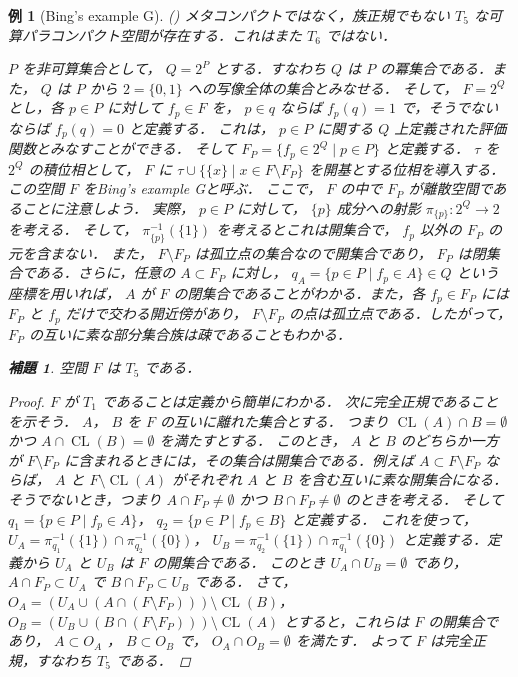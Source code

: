 \documentclass[leqno, 12pt]{ltjsarticle}
\newtheorem{lem}[thm]{補題}
\newtheorem{exam}[thm]{例}
\DeclareMathOperator{\cl}{CL}
\begin{document}
\begin{exam}[Bing's example G](\cite{Bing})
メタコンパクトではなく，族正規でもない
$T_{5}$
な可算パラコンパクト空間が存在する．これはまた
$T_{6}$
ではない．

$P$
を非可算集合として，
$Q=2^{P}$
とする．すなわち
$Q$
は
$P$
の冪集合である．また，
$Q$
は
$P$
から
$2=\{0, 1\}$
への写像全体の集合とみなせる．
そして，
$F=2^{Q}$
とし，各
$p\in P$
に対して
$f_{p}\in F$
を，
$p\in q$
ならば
$f_{p}(q)=1$
で，そうでないならば
$f_{p}(q)=0$
と定義する．
これは，
$p\in P$
に関する
$Q$
上定義された評価関数とみなすことができる．
そして
$F_{P}=\{f_{p}\in 2^{Q} \mid p\in P\}$
と定義する．
$\tau$
を
$2^{Q}$
の積位相として，
$F$
に
$\tau\cup \{\{x\} \mid x\in F\setminus F_{P}\}$
を開基とする位相を導入する．
この空間
$F$
をBing's example Gと呼ぶ．
ここで，
$F$
の中で
$F_{P}$
が離散空間であることに注意しよう．
実際，
$p\in P$
に対して，
$\{p\}$
成分への射影
$\pi_{\{p\}}:2^{Q}\to 2$
を考える．
そして，
$\pi_{\{p\}}^{-1}(\{1\})$
を考えるとこれは開集合で，
$f_{p}$
以外の
$F_{P}$
の元を含まない．
また，
$F\setminus F_{P}$
は孤立点の集合なので開集合であり，
$F_{P}$
は閉集合である．さらに，任意の
$A\subset F_{P}$
に対し，
$q_{A}=\{p\in P \mid f_{p}\in A\}\in Q$
という座標を用いれば，
$A$
が
$F$
の閉集合であることがわかる．また，各
$f_{p}\in F_{P}$
には
$F_{P}$
と
$f_{p}$
だけで交わる開近傍があり，
$F\setminus F_{P}$
の点は孤立点である．したがって，
$F_{P}$
の互いに素な部分集合族は疎であることもわかる．
\begin{lem}
空間
$F$
は
$T_{5}$
である．
\end{lem}
\begin{proof}
$F$
が
$T_{1}$
であることは定義から簡単にわかる．
次に完全正規であることを示そう．
$A$，
$B$
を
$F$
の互いに離れた集合とする．
つまり
$\cl(A)\cap B=\emptyset$
かつ
$A\cap \cl(B)=\emptyset$
を満たすとする．
このとき，
$A$
と
$B$
のどちらか一方が
$F\setminus F_{P}$
に含まれるときには，その集合は開集合である．例えば
$A\subset F\setminus F_{P}$
ならば，
$A$
と
$F\setminus\cl(A)$
がそれぞれ
$A$
と
$B$
を含む互いに素な開集合になる．
そうでないとき，つまり
$A\cap F_{P}\neq\emptyset$
かつ
$B\cap F_{P}\neq\emptyset$
のときを考える．
そして
$q_{1}=\{p\in P \mid f_{p}\in A\}$，
$q_{2}=\{p\in P \mid f_{p}\in B\}$
と定義する．
これを使って，
$U_{A}=\pi_{q_{1}}^{-1}(\{1\})\cap \pi_{q_{2}}^{-1}(\{0\})$，
$U_{B}=\pi_{q_{2}}^{-1}(\{1\})\cap \pi_{q_{1}}^{-1}(\{0\})$
と定義する．定義から
$U_{A}$
と
$U_{B}$
は
$F$
の開集合である．
このとき
$U_{A}\cap U_{B}=\emptyset$
であり，
$A\cap F_{P}\subset U_{A}$
で
$B\cap F_{P}\subset U_{B}$
である．
さて，
$O_{A}=(U_{A}\cup (A\cap (F\setminus F_{P})))\setminus \cl(B)$，
$O_{B}=(U_{B}\cup (B\cap (F\setminus F_{P})))\setminus \cl(A)$
とすると，これらは
$F$
の開集合であり，
$A\subset O_{A}$
，
$B\subset O_{B}$
で，
$O_{A}\cap O_{B}=\emptyset$
を満たす．
よって
$F$
は完全正規，すなわち
$T_{5}$
である．
\end{proof}


\end{exam}
\end{document}
